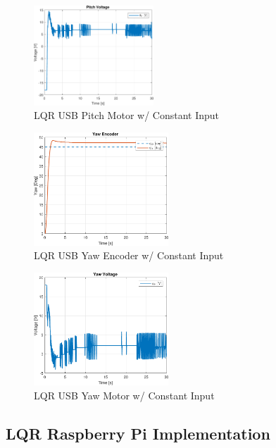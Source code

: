 \documentclass[letterpaper, 10pt, conference]{ieeeconf}
\begin{document}
\begin{figure}
  \centering
  \includegraphics[width=0.4\textwidth]{figs/matlab/LQR/P_USB/Pitch_Volt_LQR_USB_CON}
  \caption{LQR USB Pitch Motor w/ Constant Input}
  \label{fig:Pitch_Volt_LQR_USB_CON}
\end{figure}

\begin{figure}
  \centering
  \includegraphics[width=0.45\textwidth]{figs/matlab/LQR/P_USB/Yaw_Pos_LQR_USB_CON}
  \caption{LQR USB Yaw Encoder w/ Constant Input}
  \label{fig:Yaw_Pos_LQR_USB_CON}
\end{figure}

\begin{figure}
  \centering
  \includegraphics[width=0.45\textwidth]{figs/matlab/LQR/P_USB/Yaw_Volt_LQR_USB_CON}
  \caption{LQR USB Yaw Motor w/ Constant Input}
  \label{fig:Yaw_Volt_LQR_USB_CON}
\end{figure}

\subsection{LQR Raspberry Pi Implementation} \label{sec:LQR_RPi_imp}
\end{document}
